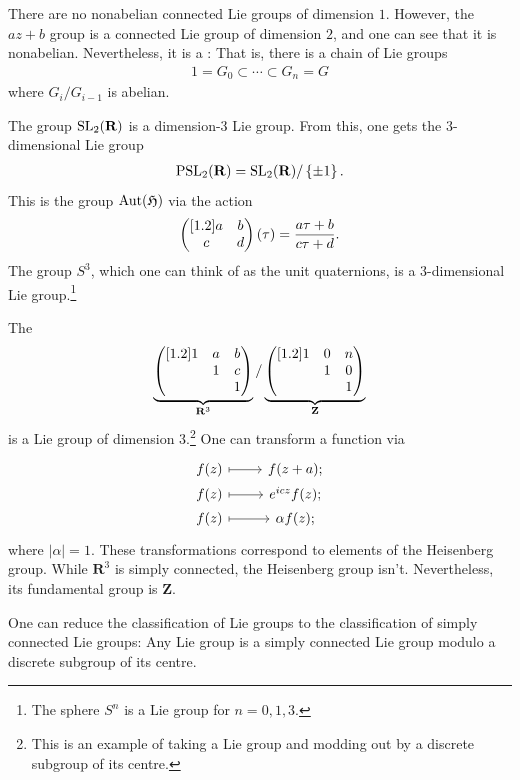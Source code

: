 \documentclass [11 pt, oneside] {article}
\begin{document}
There are no nonabelian connected Lie groups of dimension $1$. 
However, the $az+b$ group is a connected Lie group of dimension $2$, and one can see that it is nonabelian. Nevertheless, it is a : That is, there is a chain of Lie groups
\begin{align*}
	1 = G_0 \subset \cdots \subset G_{n} = G
\end{align*}
where $G_{i}/G_{i-1}$ is abelian.

The group $\operatorname{SL}_{2}(\mathbf{R})$ is a dimension-$3$ Lie group. From this, one gets the $3$-dimensional Lie group
\begin{align*}
	\operatorname{PSL}_{2}(\mathbf{R}) = \operatorname{SL}_{2}(\mathbf{R}) / \left\{ \pm 1 \right\}.
\end{align*}
This is the group $\operatorname{Aut}(\mathfrak{H})$ via the action
\begin{align*}
	\begin{pmatrix} [1.2] a&b\\c&d\end{pmatrix}(\tau) =  \frac{a\tau+b}{c\tau+d}.
\end{align*}
The group $S^{3}$, which one can think of as the unit quaternions, is a $3$-dimensional Lie group.\footnote{The sphere $S^{n}$ is a Lie group for $n=0,1,3$.}

The  
\begin{align*}
	\underbrace{\begin{pmatrix} [1.2] 1&a&b\\&1&c\\&&1\end{pmatrix} }_{\mathbf{R}^{3}} / \underbrace{\begin{pmatrix} [1.2] 1&0&n\\&1&0\\&&1\end{pmatrix}}_{\mathbf{Z}} 
\end{align*}
is a Lie group of dimension $3$.\footnote{This is an example of taking a Lie group and modding out by a discrete subgroup of its centre.}
One can transform a function via
\[
\begin{tikzcd}[row sep = 0 em]
	f(z) \ar[r,mapsto] & f(z+a);\\
	f (z) \ar[r,mapsto] & e ^{icz}f(z);\\
	f (z)\ar[r,mapsto] & \alpha f (z);
\end{tikzcd}
\]
where $\left\lvert \alpha \right\rvert =1$.
These transformations correspond to elements of the Heisenberg group.
While $\mathbf{R}^{3}$ is simply connected, the Heisenberg group isn't. Nevertheless, its fundamental group is $\mathbf{Z}$.

One can reduce the classification of Lie groups to the classification of simply connected Lie groups: Any Lie group is a simply connected Lie group modulo a discrete subgroup of its centre. 
\end{document}
